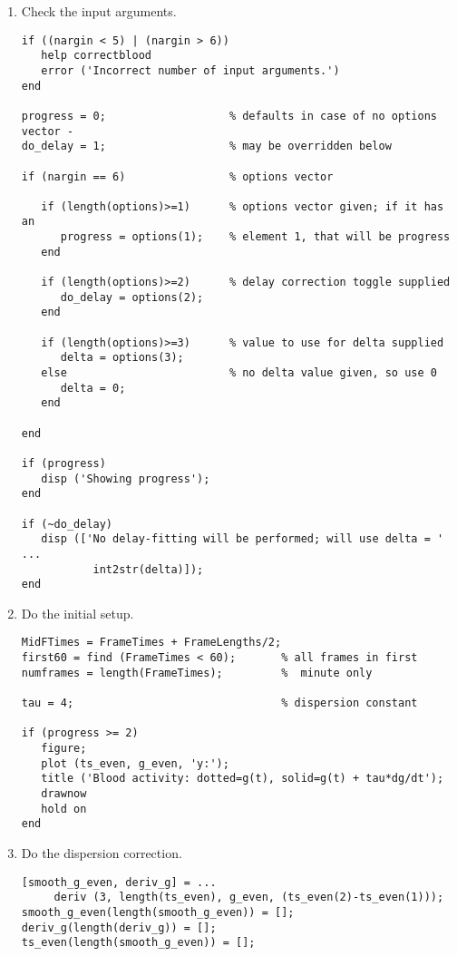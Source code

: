 \begin{enumerate}

\item Check the input arguments.
\begin{verbatim}
if ((nargin < 5) | (nargin > 6))
   help correctblood
   error ('Incorrect number of input arguments.')
end

progress = 0;                   % defaults in case of no options vector -
do_delay = 1;                   % may be overridden below
   
if (nargin == 6)                % options vector

   if (length(options)>=1)      % options vector given; if it has an
      progress = options(1);    % element 1, that will be progress
   end

   if (length(options)>=2)      % delay correction toggle supplied
      do_delay = options(2);
   end

   if (length(options)>=3)      % value to use for delta supplied
      delta = options(3);
   else                         % no delta value given, so use 0
      delta = 0;                
   end

end

if (progress) 
   disp ('Showing progress');
end

if (~do_delay) 
   disp (['No delay-fitting will be performed; will use delta = ' ...
           int2str(delta)]);
end
\end{verbatim}

\item Do the initial setup.
\begin{verbatim}
MidFTimes = FrameTimes + FrameLengths/2;
first60 = find (FrameTimes < 60);       % all frames in first
numframes = length(FrameTimes);         %  minute only

tau = 4;                                % dispersion constant

if (progress >= 2)
   figure;
   plot (ts_even, g_even, 'y:');
   title ('Blood activity: dotted=g(t), solid=g(t) + tau*dg/dt');
   drawnow
   hold on
end
\end{verbatim}

\item Do the dispersion correction.
\begin{verbatim}
[smooth_g_even, deriv_g] = ...
     deriv (3, length(ts_even), g_even, (ts_even(2)-ts_even(1)));
smooth_g_even(length(smooth_g_even)) = [];
deriv_g(length(deriv_g)) = [];
ts_even(length(smooth_g_even)) = [];
 

\end{verbatim}
\end{enumerate}
